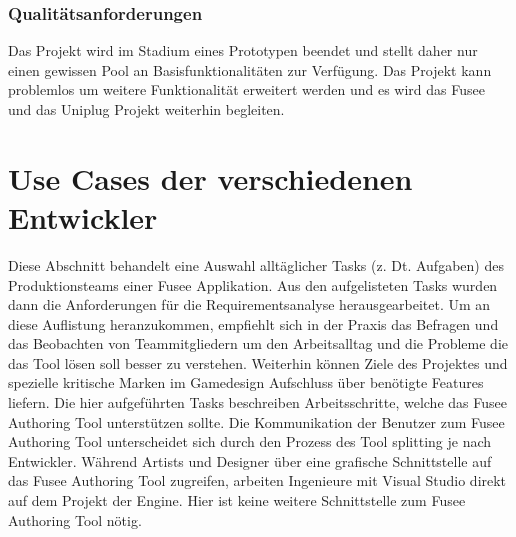 \documentclass[pagesize, paper=a4, fontsize=12pt, titlepage=true, headings=small, headnosepline, abstractoff, liststotoc, nochapterprefix, plainheadsepline, twoside]{scrreprt}
\begin{document}
\subsubsection{Qualitätsanforderungen}
Das Projekt wird im Stadium eines Prototypen beendet und stellt daher nur einen gewissen Pool an Basisfunktionalitäten zur Verfügung. Das Projekt kann problemlos um weitere Funktionalität erweitert werden und es wird das Fusee und das Uniplug Projekt weiterhin begleiten.

\section{Use Cases der verschiedenen Entwickler}
Diese Abschnitt behandelt eine Auswahl alltäglicher Tasks (z. Dt. Aufgaben) des Produktionsteams einer Fusee Applikation. Aus den aufgelisteten Tasks wurden dann die Anforderungen für die Requirementsanalyse herausgearbeitet. Um an diese Auflistung heranzukommen, empfiehlt sich in der Praxis das Befragen und das Beobachten von Teammitgliedern um den Arbeitsalltag und die Probleme die das Tool lösen soll besser zu verstehen. Weiterhin können Ziele des Projektes und spezielle kritische Marken im Gamedesign Aufschluss über benötigte Features liefern.
Die hier aufgeführten Tasks beschreiben Arbeitsschritte, welche das Fusee Authoring Tool unterstützen sollte. Die Kommunikation der Benutzer zum Fusee Authoring Tool unterscheidet sich durch den Prozess des Tool splitting je nach Entwickler. Während Artists und Designer über eine grafische Schnittstelle auf das Fusee Authoring Tool zugreifen, arbeiten Ingenieure mit Visual Studio direkt auf dem Projekt der Engine. Hier ist keine weitere Schnittstelle zum Fusee Authoring Tool nötig.
\end{document}
